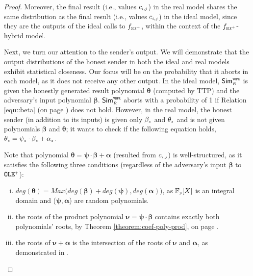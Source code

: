\begin{proof}
 Moreover, the final result (i.e., values ${c}_{\scriptscriptstyle i,j}$) in the real model shares the same distribution as the final result (i.e., values ${c}_{\scriptscriptstyle i,j}$)  in the ideal model, since they are the outputs of the ideal calls to $f_{\scriptscriptstyle \mathtt{OLE}^{\scriptscriptstyle +}}$, within the context of the $f_{\scriptscriptstyle \mathtt{OLE}^{\scriptscriptstyle +}}$-hybrid model. 

Next, we turn our attention to the sender's output. We will demonstrate that the output distributions of the honest sender in both the ideal and real models exhibit statistical closeness. 
%
%
Our focus will be on the probability that it aborts in each model, as it does not receive any other output. In the ideal model, $\mathsf{Sim}^{\scriptscriptstyle \mathtt{VOPR}}_{\scriptscriptstyle R}$ is given the honestly generated result polynomial ${\bm \theta}$ (computed by TTP) and the adversary's input polynomial ${\bm \beta}$. $\mathsf{Sim}^{\scriptscriptstyle \mathtt{VOPR}}_{\scriptscriptstyle R}$ aborts with a probability of 1 if Relation \ref{equ::beta} (on page \pageref{equ::beta}) does not hold. However, in the real model, the honest sender (in addition to its inputs) is given only $\beta_{\scriptscriptstyle  z}$ and $\theta_{\scriptscriptstyle  z}$ and is not given polynomials ${\bm\beta}$ and  ${\bm\theta}$; it wants to check if the following equation holds, $\theta_{\scriptscriptstyle z} =  \psi_{\scriptscriptstyle z}\cdot  \beta_{\scriptscriptstyle z}+ \alpha_{\scriptscriptstyle z}$. 

Note that polynomial $\bm\theta=\bm\psi\cdot \bm\beta+\bm\alpha$ (resulted from ${c}_{\scriptscriptstyle i,j}$) is well-structured, as it satisfies the following three conditions (regardless of the adversary's input $\bm\beta$ to $\mathtt{OLE}^{\scriptscriptstyle +}$): 
\begin{enumerate}[i.]

\item $deg(\bm\theta)=Max \Big(deg(\bm\beta)+deg(\bm\psi), deg(\bm\alpha) \Big)$, as $\mathbb{F}_{\scriptscriptstyle p}[X]$ is an integral domain and ($\bm\psi,\bm\alpha$) are random polynomials.

\item  the roots of the product polynomial $\bm\nu=\bm\psi\cdot \bm\beta$ contains exactly both polynomials' roots, by Theorem \ref{theorem:coef-poly-prod}, on page \pageref{theorem:coef-poly-prod}.

\item  the roots of $\bm\nu+\bm\alpha$ is the intersection of the roots of $\bm\nu$ and $\bm\alpha$, as demonstrated in \cite{DBLP:conf/crypto/KissnerS05}. 
 
 \end{enumerate}
 

\end{proof}
